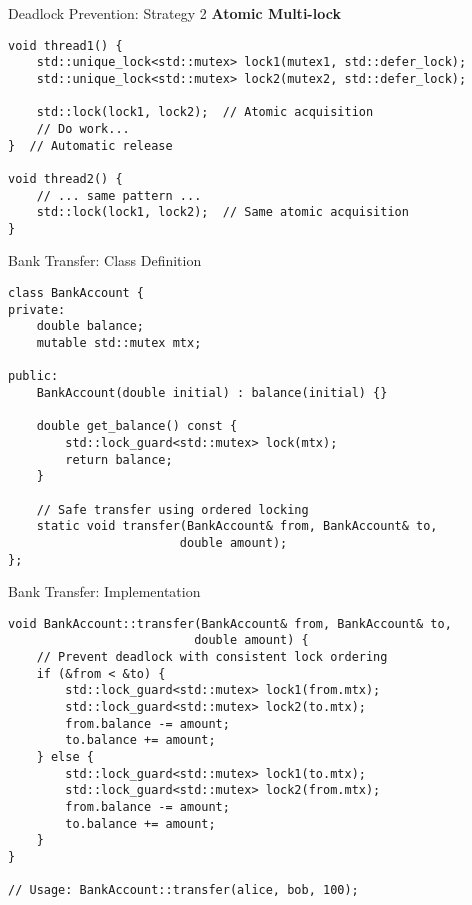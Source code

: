 \begin{frame}[fragile]{ Deadlock Prevention: Strategy 2}
	\textbf{Atomic Multi-lock}

	\begin{verbatim}
void thread1() {
    std::unique_lock<std::mutex> lock1(mutex1, std::defer_lock);
    std::unique_lock<std::mutex> lock2(mutex2, std::defer_lock);

    std::lock(lock1, lock2);  // Atomic acquisition
    // Do work...
}  // Automatic release

void thread2() {
    // ... same pattern ...
    std::lock(lock1, lock2);  // Same atomic acquisition
}
	\end{verbatim}
\end{frame}

\begin{frame}[fragile]{ Bank Transfer: Class Definition}
	\begin{verbatim}
class BankAccount {
private:
    double balance;
    mutable std::mutex mtx;

public:
    BankAccount(double initial) : balance(initial) {}

    double get_balance() const {
        std::lock_guard<std::mutex> lock(mtx);
        return balance;
    }

    // Safe transfer using ordered locking
    static void transfer(BankAccount& from, BankAccount& to,
                        double amount);
};
	\end{verbatim}
\end{frame}

\begin{frame}[fragile]{ Bank Transfer: Implementation}
	\begin{verbatim}
void BankAccount::transfer(BankAccount& from, BankAccount& to,
                          double amount) {
    // Prevent deadlock with consistent lock ordering
    if (&from < &to) {
        std::lock_guard<std::mutex> lock1(from.mtx);
        std::lock_guard<std::mutex> lock2(to.mtx);
        from.balance -= amount;
        to.balance += amount;
    } else {
        std::lock_guard<std::mutex> lock1(to.mtx);
        std::lock_guard<std::mutex> lock2(from.mtx);
        from.balance -= amount;
        to.balance += amount;
    }
}

// Usage: BankAccount::transfer(alice, bob, 100);
	\end{verbatim}
\end{frame}
